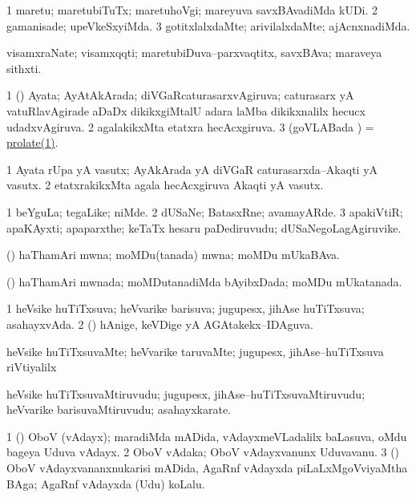 \bentry
{}
\gl{\kirxvi}
\bmng
% 
\bnum
\num{1} maretu; maretubiTuTx; maretuhoVgi; mareyuva savxBAvadiMda kUDi. 
\num{2} gamanisade; upeVkeSxyiMda. 
\num{3} gotitxlalxdaMte; arivilalxdaMte; ajAcnxnadiMda. 
\enum
\emng
\eentry

\bentry
{}
\gl{\nA}
\bmng
visamxraNate; visamxqqti; maretubiDuva--parxvaqtitx, savxBAva; maraveya sithxti. 
\emng
\eentry

\bentry
{}
\gl{\gu}
\bmng
% 
\bnum
\num{1} (\jAyx) Ayata; AyAtAkArada; diVGaRcaturasarxvAgiruva; caturasarx yA vatuRlavAgirade aDaDx dikikxgiMtalU adara laMba dikikxnalilx hecucx udadxvAgiruva. 
\num{2} agalakikxMta etatxra hecAcxgiruva. 
\num{3} (goVLABada \vi) = \hyperref{kandict_p.pdf}{P}{prolate(1)}{prolate(1)}. 
\enum
\emng
\eentry

\bentry
{}
\gl{\nA}
\bmng
\bnum
\num{1} Ayata rUpa yA vasutx; AyAkArada yA diVGaR caturasarxda--Akaqti yA vasutx. 
\num{2} etatxrakikxMta agala hecAcxgiruva Akaqti yA vasutx. 
\enum
\emng
\eentry

\bentry
{}
\gl{\nA}
\bmng
% 
\bnum
\num{1} beYguLa; tegaLike; niMde. 
\num{2} dUSaNe; BatasxRne; avamayARde. 
\num{3} apakiVtiR; apaKAyxti; apaparxthe; keTaTx hesaru paDediruvudu; dUSaNegoLagAgiruvike. 
\enum
\emng
\eentry

\bentry
{}
\gl{\nA}
\bmng
(\pArxparx) haThamAri mwna; moMDu(tanada) mwna; moMDu mUkaBAva. 
\emng
\eentry

\bentry
{}
\gl{\gu}
\bmng
(\pArxparx) haThamAri mwnada; moMDutanadiMda bAyibxDada; moMDu mUkatanada. 
\emng
\eentry

\bentry
{}
\gl{\gu}
\bmng
\bnum
\num{1} heVsike huTiTxsuva; heVvarike barisuva; jugupesx, jihAse huTiTxsuva; asahayxvAda. 
\num{2} (\viparx) hAnige, keVDige yA AGAtakekx--IDAguva. 
\enum
\emng
\eentry

\bentry
{}
\gl{\kirxvi}
\bmng
heVsike huTiTxsuvaMte; heVvarike taruvaMte; jugupesx, jihAse--huTiTxsuva riVtiyalilx 
\emng
\eentry

\bentry
{}
\gl{\nA}
\bmng
heVsike huTiTxsuvaMtiruvudu; jugupesx, jihAse--huTiTxsuvaMtiruvudu; heVvarike barisuvaMtiruvudu; asahayxkarate. 
\emng
\eentry

\bentry
{}
\gl{\nA}
\bmng
\bnum
\num{1} (\saM) OboV (vAdayx); maradiMda mADida, vAdayxmeVLadalilx baLasuva, oMdu bageya Uduva vAdayx.  
\num{2} OboV vAdaka; OboV vAdayxvanunx Uduvavanu. 
\num{3} (\saM) OboV vAdayxvananxnukarisi mADida, AgaRnf vAdayxda piLaLxMgoVviyaMtha BAga; AgaRnf vAdayxda (Udu) koLalu. 
\enum
\emng
\eentry


